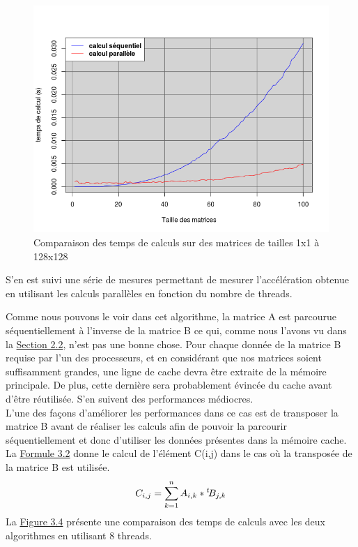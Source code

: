 \begin{figure}

	\begin{center}
	\includegraphics[scale=0.6]{premiers_resultats.png} 
	\end{center}
	\caption{Comparaison des temps de calculs sur des matrices de tailles 1x1 à 128x128}
	\label{figure:3.3}

\end{figure}

S'en est suivi une série de mesures permettant de mesurer l'accélération obtenue en utilisant les calculs parallèles en fonction du nombre de threads. 

Comme nous pouvons le voir dans cet algorithme, la matrice A est parcourue séquentiellement à l'inverse de la matrice B ce qui, comme nous l'avons vu dans la \hyperref[Section:2.2]{Section 2.2}, n'est pas une bonne chose. Pour chaque donnée de la matrice B requise par l'un des processeurs, et en considérant que nos matrices soient suffisamment grandes, une ligne de cache devra être extraite de la mémoire principale. De plus, cette dernière sera probablement évincée du cache avant d'être réutilisée. S'en suivent des performances médiocres. \\

L'une des façons d'améliorer les performances dans ce cas est de transposer la matrice B avant de réaliser les calculs afin de pouvoir la parcourir séquentiellement et donc d'utiliser les données présentes dans la mémoire cache. La \hyperref[formule:3.2]{Formule 3.2} donne le calcul de l'élément C(i,j) dans le cas où la transposée de la matrice B est utilisée.
\begin{equation}
\large{C_{i,j} = \sum_{k=1}^{n} A_{i,k}*{}^t \! B_{j,k}} \label{formule:3.2}
\end{equation}
 La \hyperref[figure:3.3]{Figure 3.4} présente une comparaison des temps de calculs avec les deux algorithmes en utilisant 8 threads. 

